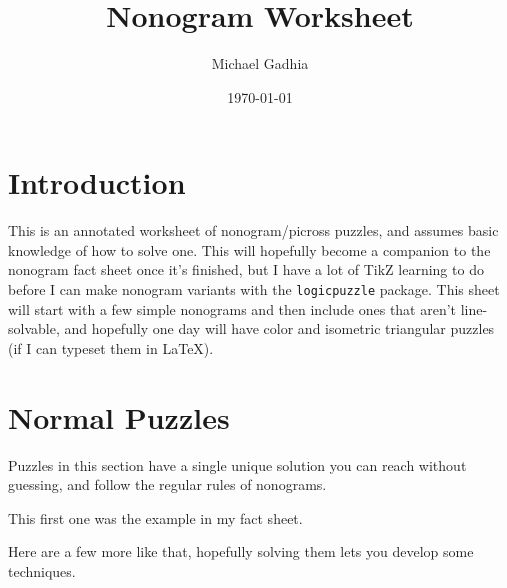 \documentclass{article}
\title{Nonogram Worksheet}
\author{Michael Gadhia}
\date{\today}
\begin{document}
\maketitle

\section{Introduction}

This is an annotated worksheet of nonogram/picross puzzles, and assumes basic knowledge of how to solve one.
This will hopefully become a companion to the nonogram fact sheet once it's finished, but I have a lot of TikZ learning to do before I can make nonogram variants with the \texttt{logicpuzzle} package.
This sheet will start with a few simple nonograms and then include ones that aren't line-solvable, and hopefully one day will have color and isometric triangular puzzles (if I can typeset them in \LaTeX).

\section{Normal Puzzles}

Puzzles in this section have a single unique solution you can reach without guessing, and follow the regular rules of nonograms.

This first one was the example in my fact sheet.

\begin{center}
    \begin{nonogram}[rows=5,columns=5,scale=0.35,width=3cm,
        fontsize=footnotesize,helplines=5,extracells=2]


    \end{nonogram}
\end{center}

Here are a few more like that, hopefully solving them lets you develop some techniques.
\end{document}
